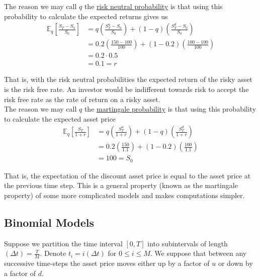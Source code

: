 \documentclass[12pt]{article}
\newlength\tindent
\renewcommand{\indent}{\hspace*{\tindent}}
\newcommand{\E}{\mathbb E}
\begin{document}
\indent The reason we may call $q$ the \underline{risk neutral probability} is that using this probability to calculate the expected returns gives us
\begin{align*}
	\E_q \left[ \frac{S_T - S_0}{S_0} \right] &= q \left( \frac{S^u_T - S_0}{S_0} \right) + (1 - q) \left( \frac{S^d_T - S_0}{S_0} \right) \\
	&= 0.2 \left( \frac{150 - 100}{100} \right) + (1 - 0.2) \left( \frac{100 - 100}{100} \right) \\
	&= 0.2\cdot 0.5 \\
	&= 0.1 = r
\end{align*}

\indent That is, with the risk neutral probabilities the expected return of the risky asset is the risk free rate. An investor would be indifferent towards risk to accept the risk free rate as the rate of return on a risky asset. \\

\indent The reason we may call $q$ the \underline{martingale probability} is that using this probability to calculate the expected asset price
\begin{align*}
	\E_q \left[ \frac{S_T}{1 + r} \right] &= q \left( \frac{S^u_T}{1 + r} \right) + (1 - q) \left( \frac{S^d_T}{1 + r} \right) \\ 
	&= 0.2 \left( \frac{150}{1.1} \right) + (1 - 0.2) \left( \frac{100}{1.1} \right) \\ 
	&= 100 = S_0
\end{align*}

\indent That is, the expectation of the discount asset price is equal to the asset price at the previous time step. This is a general property (known as the martingale property) of some more complicated models and makes computations simpler.

\subsection{Binomial Models}

\indent Suppose we partition the time interval $[0, T]$ into subintervals of length $(\Delta t) = \frac{T}{M}$. Denote $t_i = i(\Delta t)$ for $0 \leq i \leq M$. We suppose that between any successive time-steps the asset price moves either up by a factor of $u$ or down by a factor of $d$.

\begin{center}
\end{center}
\end{document}
